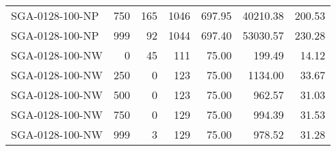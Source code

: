 \begin{table}[htbp]
{\begin{tabular}{lrrrrrr}
    SGA-0128-100-NP & 750    & 165    & 1046   & 697.95 & 40210.38 & 200.53 \\
    SGA-0128-100-NP & 999    & 92     & 1044   & 697.40 & 53030.57 & 230.28 \\ \hline
    SGA-0128-100-NW & 0      & 45     & 111    & 75.00  & 199.49 & 14.12 \\
    SGA-0128-100-NW & 250    & 0      & 123    & 75.00  & 1134.00 & 33.67 \\
    SGA-0128-100-NW & 500    & 0      & 123    & 75.00  & 962.57 & 31.03 \\
    SGA-0128-100-NW & 750    & 0      & 129    & 75.00  & 994.39 & 31.53 \\
    SGA-0128-100-NW & 999    & 3      & 129    & 75.00  & 978.52 & 31.28 \\
    \bottomrule
    \end{tabular}}
  \label{tab:addlabel}%
\end{table}%
